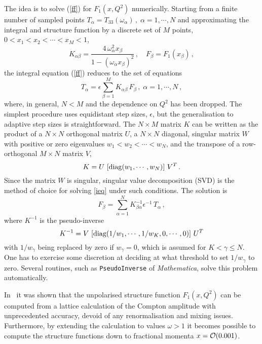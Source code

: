The idea is to solve (\ref{ff}) for $F_1(x,Q^2)$ numerically. Starting from a finite number of sampled points $T_\alpha=T_{33}(\omega_\alpha) \,,\; \alpha=1, \cdots, N$ and approximating the integral and structure function by a discrete set of $M$ points, $0 < x_1 < x_2 < \cdots < x_M < 1$, 
\begin{equation}
K_{\alpha\beta} = \frac{4\,\omega_\alpha^2x_\beta}{1-(\omega_\alpha x_\beta)^2} \,, \quad F_\beta = F_1(x_\beta)\,,
\end{equation}
the integral equation (\ref{ff}) reduces to the set of equations 
\begin{equation}
T_\alpha = \epsilon \sum_{\beta=1}^M K_{\alpha\beta}\, F_\beta \,,\; \alpha=1, \cdots, N \,,
\label{ieq}
\end{equation}
where, in general, $N < M$ and the dependence on $Q^2$ has been dropped. The simplest procedure uses equidistant step sizes, $\epsilon$, but the generalisation to adaptive step sizes is straightforward. The $N \times M$ matrix $K$ can be written as the product of a $N \times N$ orthogonal matrix $U$, a $N \times N$ diagonal, singular matrix $W$ with positive or zero eigenvalues $w_1 < w_2 < \cdots < w_N$, and the transpose of a row-orthogonal $M \times N$ matrix $V$,
\begin{equation}
K = U \,\left[{\rm diag}(w_1, \cdots, w_N)\right]\,V^T \,.
\end{equation}
Since the matrix $W$ is singular, singular value decomposition (SVD) is the method of choice for solving \eqref{ieq} under such conditions. The solution is
\begin{equation}
F_\beta = \sum_{\alpha=1}^N K^{-1}_{\beta\alpha}\epsilon^{-1}\, T_\alpha \,, 
\label{svd}
\end{equation}
where $K^{-1}$ is the pseudo-inverse
\begin{equation}
K^{-1} = V \,\left[{\rm diag}(1/w_1, \cdots, 1/w_K, 0, \cdots, 0)\right]\, U^T 
\end{equation}
with $1/w_\gamma$ being replaced by zero if $w_\gamma=0$, which is assumed for $K < \gamma\leq N$. One has to exercise some discretion at deciding at
what threshold to set $1/w_\gamma$ to zero. Several routines, such as {\tt PseudoInverse} of {\it Mathematica}, solve this problem
automatically. 

In~\cite{Chambers:2017dov} it was shown that the unpolarised structure function $F_1(x,Q^2)$ can be computed from a lattice calculation of the Compton amplitude with unprecedented accuracy, devoid of any renormalisation and mixing issues. Furthermore, by extending the calculation to values $\omega > 1$ it becomes possible
to compute the structure functions down to fractional momenta $x = {\cal O}(0.001)$.

